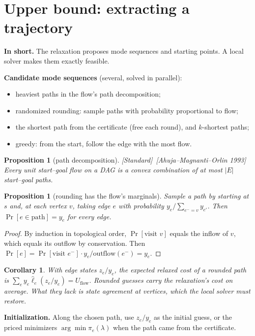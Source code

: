 \documentclass[11pt]{article}
\newcommand{\Uflow}{U_{\mathrm{flow}}}
\newcommand{\inshort}[1]{\par\noindent\textcolor{accent}{\textbf{In short.}} #1\par\smallskip}
\newcommand{\std}{\textcolor{muted}{[Standard]}\ }
\theoremstyle{plain}
\newtheorem{proposition}[theorem]{Proposition}
\newtheorem{corollary}[theorem]{Corollary}
\theoremstyle{definition}
\theoremstyle{remark}
\begin{document}
\section{Upper bound: extracting a trajectory}\label{sec:upper}
\inshort{The relaxation proposes mode sequences and starting points. A local solver makes them exactly feasible.}

\textbf{Candidate mode sequences} (several, solved in parallel):
\begin{itemize}[leftmargin=1.2em]
  \item heaviest paths in the flow's path decomposition;
  \item randomized rounding: sample paths with probability proportional to flow;
  \item the shortest path from the certificate (free each round), and $k$-shortest paths;
  \item greedy: from the start, follow the edge with the most flow.
\end{itemize}

\begin{proposition}[path decomposition]\label{prop:decomp}
\std[Ahuja--Magnanti--Orlin 1993] Every unit start--goal flow on a DAG is a convex combination of at most $|E|$ start--goal paths.
\end{proposition}

\begin{proposition}[rounding has the flow's marginals]\label{prop:round}
Sample a path by starting at $s$ and, at each vertex $v$, taking edge $e$ with probability $y_e/\sum_{e^-=v}y_{e'}$. Then $\Pr[e\in\text{path}]=y_e$ for every edge.
\end{proposition}
\begin{proof}
By induction in topological order, $\Pr[\text{visit }v]$ equals the inflow of $v$, which equals its outflow by conservation. Then $\Pr[e]=\Pr[\text{visit }e^-]\cdot y_e/\mathrm{outflow}(e^-)=y_e$.
\end{proof}
\begin{corollary}\label{cor:roundcost}
With edge states $z_e/y_e$, the expected relaxed cost of a rounded path is $\sum_ey_e\hat\ell_e(z_e/y_e)=\Uflow$. Rounded guesses carry the relaxation's cost on average. What they lack is state agreement at vertices, which the local solver must restore.
\end{corollary}

\textbf{Initialization.} Along the chosen path, use $z_e/y_e$ as the initial guess, or the priced minimizers $\arg\min\pi_e(\lambda)$ when the path came from the certificate.
\end{document}
